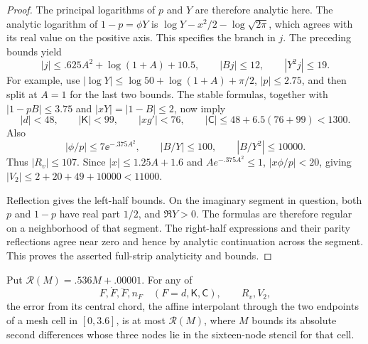 \begin{proof}
The principal logarithms of $p$ and $Y$ are therefore analytic here. The analytic logarithm of $1-p=\phi Y$ is $\log Y-x^2/2-\log\sqrt{2\pi}$, which agrees with its real value on the positive axis. This specifies the branch in $j$. The preceding bounds yield
\[
 |j|\le .625A^2+\log(1+A)+10.5,\qquad
 |Bj|\le12,\qquad |Y^2j|\le19.
\]
For example, use $|\log Y|\le\log50+\log(1+A)+\pi/2$, $|p|\le2.75$, and then split at $A=1$ for the last two bounds. The stable formulas, together with $|1-pB|\le3.75$ and $|xY|=|1-B|\le2$, now imply
\[
 |d|<48,\qquad |\mathsf K|<99,\qquad |xg'|<76,
 \qquad |\mathsf C|\le48+6.5(76+99)<1300.
\]
Also
\[
 |\phi/p|\le7\ee^{-.375A^2},\qquad
 |B/Y|\le100,\qquad |B/Y^2|\le10000.
\]
Thus $|R_v|\le107$. Since $|x|\le1.25A+1.6$ and $Ae^{-.375A^2}\le1$, $|x\phi/p|<20$, giving $|V_2|\le2+20+49+10000<11000$.

Reflection gives the left-half bounds. On the imaginary segment in question, both $p$ and $1-p$ have real part $1/2$, and $\Re Y>0$. The formulas are therefore regular on a neighborhood of that segment. The right-half expressions and their parity reflections agree near zero and hence by analytic continuation across the segment. This proves the asserted full-strip analyticity and bounds.
\end{proof}

\begin{lemma}
\label{lem:scalar-interpolation}
Put $\mathcal{R}(M)=.536M+.00001$. For any of
\[
 F,\dot F,\ddot F,n_F\quad(F=d,\mathsf K,\mathsf C),
 \qquad R_v,V_2,
\]
the error from its central chord, the affine interpolant through the two endpoints of a mesh cell in $[0,3.6]$, is at most $\mathcal{R}(M)$, where $M$ bounds its absolute second differences whose three nodes lie in the sixteen-node stencil for that cell.
\end{lemma}

